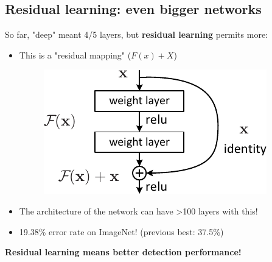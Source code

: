 \documentclass{beamer}[10pt, usepdftitle=false, handout]
\begin{document}
	   	      
	\subsection{Residual learning: even bigger networks}    
    \begin{frame}

	So far, "deep" meant 4/5 layers, but \textbf{residual learning} permits more:

	\vspace*{2em}
	
	\begin{itemize}
		\item{This is a "residual mapping" ($F(x) + X$)
			\begin{figure}
				\includegraphics[scale=0.5]{34.png} 
			\end{figure}				
		}
		\item{The architecture of the network can have >100 layers with this!}
		\item{19.38\% error rate on ImageNet! (previous best: 37.5\%)}
	\end{itemize}
	\vspace*{2em}	
	
	\textbf{Residual learning means better detection performance!}

    \end{frame}      
    
\end{document}
